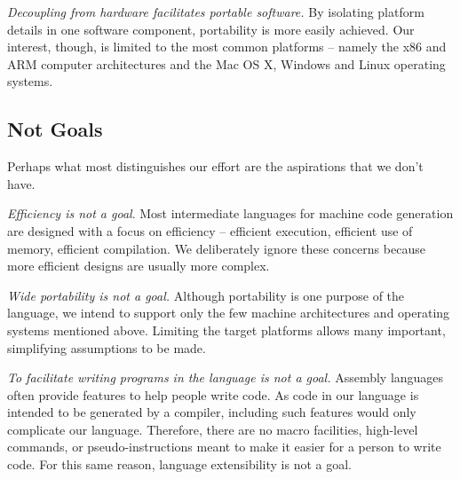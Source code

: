 \emph{Decoupling from hardware facilitates portable software.}
By isolating platform details in one software component,
portability is more easily achieved.
Our interest, though, is limited to the most common platforms -- namely
the x86 and ARM computer architectures and the Mac OS X, Windows and
Linux operating systems.

\subsection{Not Goals}

Perhaps what most distinguishes our effort
are the aspirations that we don't have.

\emph{Efficiency is not a goal}.
Most intermediate languages for machine code generation
are designed with a focus on efficiency --
efficient execution, efficient use of memory, efficient compilation.
We deliberately ignore these concerns because more efficient designs
are usually more complex.

\emph{Wide portability is not a goal.}
Although portability is one purpose of the language, we intend
to support only the few machine architectures and operating systems
mentioned above. Limiting the target platforms allows many important,
simplifying assumptions to be made.

\emph{To facilitate writing programs in the language is not a goal.}
Assembly languages often provide features
to help people write code.
As code in our language is intended to be generated
by a compiler, including such features would only complicate our language.
Therefore, there are no macro facilities, high-level commands,
or pseudo-instructions meant to make it easier for a person to write code.
For this same reason, language extensibility is not a goal.
